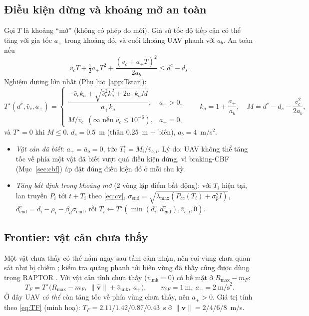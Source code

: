 \documentclass[11pt,a4paper]{article}
\numberwithin{equation}{section}
\newcommand{\vb}[1]{\bm{#1}}
\newcommand{\lmax}{\lambda_{\max}}
\theoremstyle{definition}
\theoremstyle{plain}
\theoremstyle{remark}
\begin{document}
\subsection{Điều kiện dừng và khoảng mở an toàn}
Gọi $T$ là khoảng ``mở'' (không có phép đo mới). Giả sử tốc độ tiếp cận có thể tăng với gia tốc $a_+$ trong khoảng đó, và cuối khoảng UAV phanh với $a_b$. An toàn nếu
\begin{equation}
\bar v_cT+\tfrac12a_+T^2+\frac{(\bar v_c+a_+T)^2}{2a_b}\le d^c-d_s. \label{eq:stop}
\end{equation}
Nghiệm dương lớn nhất (Phụ lục~\ref{app:Tstar}):
\begin{equation}
T^\star(d^c,\bar v_c,a_+)=\begin{cases}
\dfrac{-\bar v_ck_a+\sqrt{\bar v_c^2k_a^2+2a_+k_aM}}{a_+k_a}, & a_+>0,\\[2mm]
M/\bar v_c\ \ (\infty\text{ nếu }\bar v_c\le10^{-6}), & a_+=0,
\end{cases}\qquad k_a=1+\frac{a_+}{a_b},\quad M=d^c-d_s-\frac{\bar v_c^2}{2a_b}, \label{eq:Tstar}
\end{equation}
và $T^\star=0$ khi $M\le0$. $d_s=0.5$~m (thân 0.25~m + biên), $a_b=4$~m/s$^2$.
\begin{itemize}
\item \emph{Vật cản đã biết}: $a_+=\bar a_o=0$, tức $T^\star_i=M_i/\bar v_{c,i}$. Lý do: UAV không thể tăng tốc về phía một vật đã biết vượt quá điều kiện dừng, vì braking-CBF (Mục~\ref{sec:cbf}) áp đặt đúng điều kiện đó ở mỗi chu kỳ.
\item \emph{Tăng bất định trong khoảng mở} (2 vòng lặp điểm bất động): với $T_i$ hiện tại, lan truyền $P_i$ tới $t+T_i$ theo \eqref{eq:cv}, $\sigma_{\text{end}}=\sqrt{\lmax(P_{cc}(T_i)+\sigma_p^2I)}$, $d^c_{\text{end}}=d_i-\rho_i-\beta_d\sigma_{\text{end}}$, rồi $T_i\leftarrow T^\star(\min(d^c_i,d^c_{\text{end}}),\bar v_{c,i},0)$.
\end{itemize}

\subsection{Frontier: vật cản chưa thấy}
Một vật chưa thấy có thể nằm ngay sau tầm cảm nhận, nên coi vùng chưa quan sát như bị chiếm \cite{liu2016highspeed}; kiểm tra quãng phanh tới biên vùng đã thấy cũng được dùng trong RAPTOR \cite{zhou2020raptor}. Với vật cản tĩnh chưa thấy ($\bar v_{\text{unk}}=0$) có bề mặt ở $R_{\max}-m_F$:
\begin{equation}
T_F=T^\star\big(R_{\max}-m_F,\ \|\hat{\vb v}\|+\bar v_{\text{unk}},\ a_+\big),\qquad m_F=1~\text{m},\ a_+=2~\text{m/s}^2. \label{eq:TF}
\end{equation}
Ở đây UAV \emph{có thể} còn tăng tốc về phía vùng chưa thấy, nên $a_+>0$. Giá trị tính theo \eqref{eq:TF} (minh hoạ): $T_F=2.11/1.42/0.87/0.43$~s ở $\|\vb v\|=2/4/6/8$~m/s.
\end{document}
